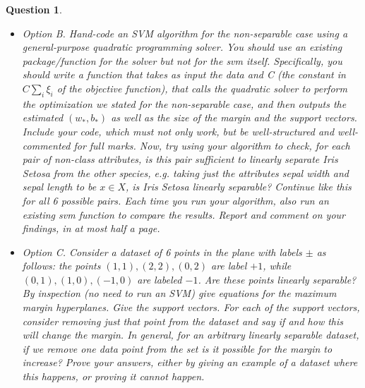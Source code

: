 \documentclass[12pt]{article}
\newtheorem{question}{Question}
\begin{document}
\begin{question}
  \begin{itemize}
  \item 
    Option B. Hand-code an SVM algorithm for the non-separable case using a general-purpose quadratic programming solver. You should use an existing package/function for the solver but not for the svm itself. Specifically, you should write a function that takes as input the data and C (the constant in $C \sum\limits_i \xi_i$ of the objective function), that calls the quadratic solver to perform the optimization we stated for the non-separable case, and then outputs the estimated $(w_*, b_*)$ as well as the size of the margin and the support vectors. Include your code, which must not only work, but be well-structured and well-commented for full marks. Now, try using your algorithm to check, for each pair of non-class attributes, is this pair sufficient to linearly separate Iris Setosa from the other species, e.g. taking just the attributes sepal width and sepal length to be $x \in X$, is Iris Setosa linearly separable? Continue like this for all 6 possible pairs. Each time you run your algorithm, also run an existing svm function to compare the results. Report and comment on your findings, in at most half a page.
  \item
    Option C. Consider a dataset of 6 points in the plane with labels $\pm$ as follows: the points $(1,1), (2,2), (0,2)$ are label $+1$, while $(0,1),(1,0),(-1,0)$ are labeled $-1$. Are these points linearly separable? By inspection (no need to run an SVM) give equations for the maximum margin hyperplanes. Give the support vectors. For each of the support vectors, consider removing just that point from the dataset and say if and how this will change the margin. In general, for an arbitrary linearly separable dataset, if we remove one data point from the set is it possible for the margin to increase? Prove your answers, either by giving an example of a dataset where this happens, or proving it cannot happen.
  \end{itemize}
\end{question}
\end{document}
